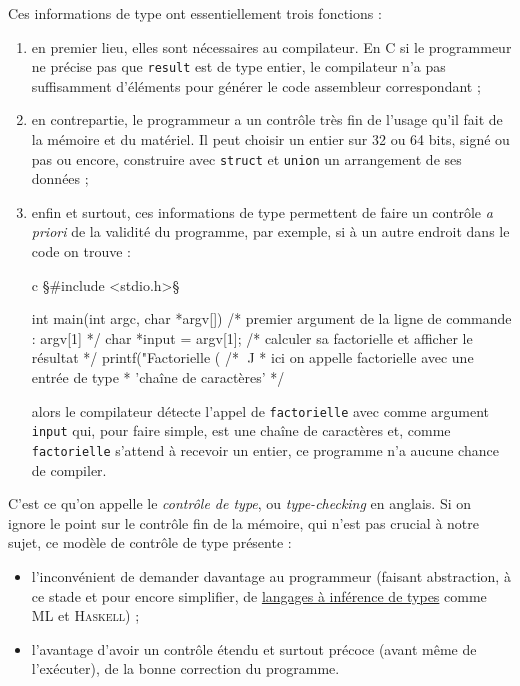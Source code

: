 Ces informations de type ont essentiellement trois fonctions :
\begin{enumerate}
	\item en premier lieu, elles sont nécessaires au compilateur. En C si le programmeur ne précise pas que \texttt{result} est de type entier, le compilateur n'a pas suffisamment d'éléments pour générer le code assembleur correspondant ;
	\item en contrepartie, le programmeur a un contrôle très fin de l'usage qu'il fait de la mémoire et du matériel. Il peut choisir un entier sur 32 ou 64 bits, signé ou pas ou encore, construire avec \texttt{struct} et \texttt{union} un arrangement de ses données ;
	\item enfin et surtout, ces informations de type permettent de faire un contrôle \textit{a priori} de la validité du programme, par exemple, si à un autre endroit dans le code on trouve :
	
\begin{code*}[before skip=6pt]{c}
§\#{}include <stdio.h>§

int main(int argc, char *argv[]) {
	/* premier argument de la ligne de commande : argv[1] */
	char *input = argv[1];
	/* calculer sa factorielle et afficher le résultat */
	printf("Factorielle (%
	/*                                               ^^^^^
	* ici on appelle factorielle avec une entrée de type 
	* 'chaîne de caractères' */
}
\end{code*}

\noindent alors le compilateur détecte l'appel de \texttt{factorielle} avec comme argument \texttt{input} qui, pour faire simple, est une chaîne de caractères et, comme \texttt{factorielle} s'attend à recevoir un entier, ce programme n'a aucune chance de compiler.
\end{enumerate}

C'est ce qu'on appelle le \emph{contrôle de type}, ou \textit{type-checking} en anglais. Si on ignore le point sur le contrôle fin de la mémoire, qui n'est pas crucial à notre sujet, ce modèle de contrôle de type présente :
\begin{itemize}
	\item l'inconvénient de demander davantage au programmeur (faisant abstraction, à ce stade et pour encore simplifier, de \href{https://en.wikipedia.org/wiki/Type\_inference}{langages à inférence de types} comme \textsc{ML} et \textsc{Haskell}) ;
	\item l'avantage d'avoir un contrôle étendu et surtout précoce (avant même de l'exécuter), de la bonne correction du programme.
\end{itemize}

